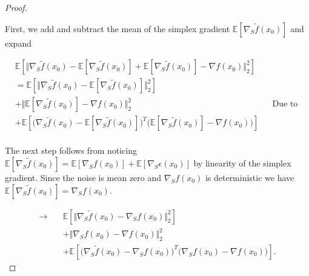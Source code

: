 \begin{proof}\label{prf:mse_noise}

First, we add and subtract the mean of the simplex gradient $\mathbb{E}[\nabla_S \tilde{f} (x_0)]$ and expand

\begin{align}
    &\mathbb{E}[\Vert \nabla_{S} \tilde{f}(x_0) - \mathbb{E}[ \nabla_{S} \tilde{f}(x_0)] + \mathbb{E}[ \nabla_{S} \tilde{f}(x_0) ] - \nabla f(x_0) \Vert_2^2] \\
    &= \mathbb{E}[\Vert \nabla_{S} \tilde{f}(x_0) - \mathbb{E}[ \nabla_{S} \tilde{f}(x_0)]  \Vert_2^2] \\
    &+ \Vert \mathbb{E}[\nabla_{S} \tilde{f}(x_0) ] - \nabla f(x_0) \Vert_2^2 && \text{Due to expectation of a constant.}\\
    &+ \mathbb{E}[\Big( \nabla_{S} \tilde{f}(x_0) - \mathbb{E}[ \nabla_{S} \tilde{f}(x_0)] \Big)^T \Big( \mathbb{E}[ \nabla_{S} \tilde{f}(x_0) ] - \nabla f(x_0)\Big) ] \\
\end{align}

The next step follows from noticing $\mathbb{E}[\nabla_{S} \tilde{f}(x_0)] = \mathbb{E}[\nabla_{S} f(x_0)] + \mathbb{E}[\nabla_{S} \epsilon(x_0)]$ by linearity of the simplex gradient. Since the noise is mean zero and $\nabla_{S} f(x_0)$ is deterministic we have $\mathbb{E}[\nabla_{S} \tilde{f}(x_0)] = \nabla_S f(x_0)$. 

\begin{align}
    \rightarrow \quad &\mathbb{E}[\Vert \nabla_{S} \tilde{f}(x_0) - \nabla_S f(x_0)  \Vert_2^2] \\
    &+ \Vert \nabla_S f(x_0) - \nabla f(x_0) \Vert_2^2 \\
    &+ \mathbb{E}[\Big( \nabla_{S} \tilde{f}(x_0) - \nabla_S f(x_0) \Big)^T \Big( \nabla_S f(x_0) - \nabla f(x_0)\Big) ].
\end{align}


\end{proof}
